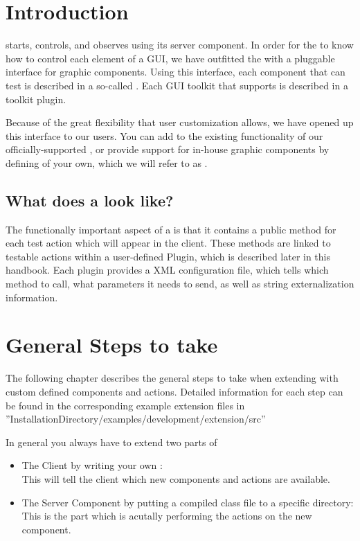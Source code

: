 \chapter{Introduction}
\label{introduction}

\app{} starts, controls, and observes \gdauts using its server
component. In order for the \gdagent to know how to control each
element of a GUI, we have outfitted the \gdagent with a pluggable interface
for graphic components. Using this interface, each component that \app{}
can test is described in a
so-called \textbf{\gdimplclass{}}. Each GUI toolkit that \app{} supports
is described in a toolkit plugin.

Because of the great flexibility that user customization allows, we
have opened up this interface to our users. You can add to the existing functionality of our officially-supported
\gdimplclasses{},
or provide support for in-house graphic components by
defining \gdimplclasses of your own, which we will refer to as
\textbf{\gdtesterclasses}.

\section{What does a \gdtesterclass look like?}

The functionally important aspect of a \gdtesterclass is that it
contains a public method for each \app{} test action which will appear in
the client. These methods are linked to testable actions within a user-defined
\app{} Plugin, which is described later in this handbook. Each plugin
provides a XML configuration file,
which tells \app{} which method to call, what parameters it needs to
send, as well as string externalization information.

\chapter{General Steps to take}
\label{generalSteps}

The following chapter describes the general steps to take when extending \app{} with
custom defined components and actions. Detailed information for each step can be found in the
corresponding example extension files in 
''InstallationDirectory/examples/development/extension/src''

In general you always have to extend two parts of \app{}
\begin{itemize}
\item The \app{} Client by writing your own :\\
      This will tell the client which new components and actions are available.
\item The \app{} Server Component by putting a compiled class file to a specific directory:\\
      This is the part which is acutally performing the actions on the new component.
\end{itemize}

